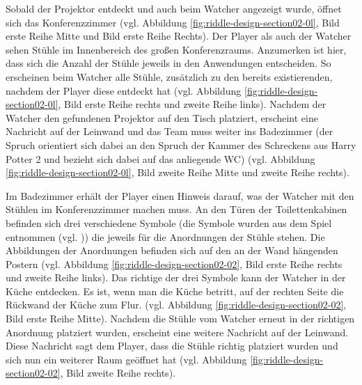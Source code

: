 Sobald der Projektor entdeckt und auch beim Watcher angezeigt wurde, öffnet sich das Konferenzzimmer (vgl. Abbildung \ref{fig:riddle-design-section02-0l}, Bild erste Reihe Mitte und Bild erste Reihe Rechts). Der Player als auch der Watcher sehen Stühle im Innenbereich des großen Konferenzraums. Anzumerken ist hier, dass sich die Anzahl der Stühle jeweils in den Anwendungen entscheiden. So erscheinen beim Watcher alle Stühle, zusätzlich zu den bereits existierenden, nachdem der Player diese entdeckt hat (vgl. Abbildung \ref{fig:riddle-design-section02-0l}, Bild erste Reihe rechts und zweite Reihe links). Nachdem der Watcher den gefundenen Projektor auf den Tisch platziert, erscheint eine Nachricht auf der Leinwand und das Team muss weiter ins Badezimmer (der Spruch  orientiert sich dabei an den Spruch der Kammer des Schreckens aus Harry Potter 2 und bezieht sich dabei auf das anliegende WC) (vgl. Abbildung \ref{fig:riddle-design-section02-0l}, Bild zweite Reihe Mitte und zweite Reihe rechts).

Im Badezimmer erhält der Player einen Hinweis darauf, was der Watcher mit den Stühlen im Konferenzzimmer machen muss. An den Türen der Toilettenkabinen befinden sich drei verschiedene Symbole (die Symbole wurden aus dem Spiel  entnommen (vgl. \cite{noauthor_we_nodate})) die jeweils für die Anordnungen der Stühle stehen. Die Abbildungen der Anordnungen befinden sich auf den an der Wand hängenden Postern (vgl. Abbildung \ref{fig:riddle-design-section02-02}, Bild erste Reihe rechts und zweite Reihe links). Das richtige der drei Symbole kann der Watcher in der Küche entdecken. Es ist, wenn man die Küche betritt, auf der rechten Seite die Rückwand der Küche zum Flur. (vgl. Abbildung \ref{fig:riddle-design-section02-02}, Bild erste Reihe Mitte). Nachdem die Stühle vom Watcher erneut in der richtigen Anordnung platziert wurden, erscheint eine weitere Nachricht auf der Leinwand.  Diese Nachricht sagt dem Player, dass die Stühle richtig platziert wurden und sich nun ein weiterer Raum geöffnet hat (vgl. Abbildung \ref{fig:riddle-design-section02-02}, Bild zweite Reihe rechts).

